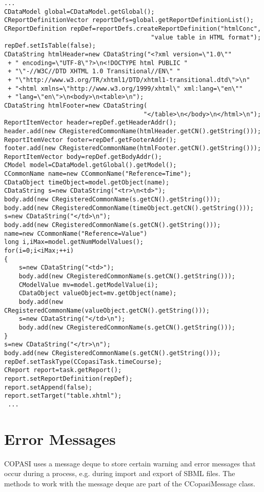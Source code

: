 \documentclass[a4,10pt]{article}
\begin{document}
\begin{lstlisting}
...
CDataModel global=CDataModel.getGlobal();
CReportDefinitionVector reportDefs=global.getReportDefinitionList();
CReportDefinition repDef=reportDefs.createReportDefinition("htmlConc",
                                        "value table in HTML format");
repDef.setIsTable(false);
CDataString htmlHeader=new CDataString("<?xml version=\"1.0\"" 
 + " encoding=\"UTF-8\"?>\n<!DOCTYPE html PUBLIC "
 + "\"-//W3C//DTD XHTML 1.0 Transitional//EN\" "
 + "\"http://www.w3.org/TR/xhtml1/DTD/xhtml1-transitional.dtd\">\n"
 + "<html xmlns=\"http://www.w3.org/1999/xhtml\" xml:lang=\"en\""
 + "lang=\"en\">\n<body>\n<table>\n");
CDataString htmlFooter=new CDataString(
                                      "</table>\n</body>\n</html>\n");
ReportItemVector header=repDef.getHeaderAddr(); 
header.add(new CRegisteredCommonName(htmlHeader.getCN().getString()));
ReportItemVector footer=repDef.getFooterAddr(); 
footer.add(new CRegisteredCommonName(htmlFooter.getCN().getString()));
ReportItemVector body=repDef.getBodyAddr(); 
CModel model=CDataModel.getGlobal().getModel();
CCommonName name=new CCommonName("Reference=Time");
CDataObject timeObject=model.getObject(name);
CDataString s=new CDataString("<tr>\n<td>");
body.add(new CRegisteredCommonName(s.getCN().getString()));
body.add(new CRegisteredCommonName(timeObject.getCN().getString()));
s=new CDataString("</td>\n");
body.add(new CRegisteredCommonName(s.getCN().getString()));
name=new CCommonName("Reference=Value")
long i,iMax=model.getNumModelValues();
for(i=0;i<iMax;++i)
{
    s=new CDataString("<td>");
    body.add(new CRegisteredCommonName(s.getCN().getString()));
    CModelValue mv=model.getModelValue(i);
    CDataObject valueObject=mv.getObject(name);
    body.add(new CRegisteredCommonName(valueObject.getCN().getString()));
    s=new CDataString("</td>\n");
    body.add(new CRegisteredCommonName(s.getCN().getString()));
}
s=new CDataString("</tr>\n");
body.add(new CRegisteredCommonName(s.getCN().getString()));
repDef.setTaskType(CCopasiTask.timeCourse);
CReport report=task.getReport();
report.setReportDefinition(repDef);
report.setAppend(false);
report.setTarget("table.xhtml");
 ...
\end{lstlisting}

\section{Error Messages}
\label{ErrorMessages}
COPASI uses a message deque to store certain warning and error messages that occur during a process, e.g. during import and export of SBML files.
The methods to work with the message deque are part of the CCopasiMessage class.
\end{document}

